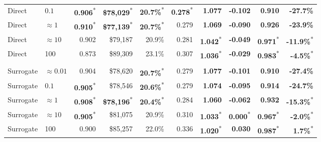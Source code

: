 \documentclass[10pt]{article}
\theoremstyle{definition}
\newcommand{\1}{\mathbf{1}}
\newcommand{\latesttext}[1]{\textcolor{latestPurple}{#1}}
\begin{document}
{\begin{table}[!htbp]
{\begin{tabular}{llrrrrrrrr}
Direct & \latesttext{$0.1$} & \textbf{0.906}\textsuperscript{*} & \textbf{\$78,029}\textsuperscript{*} & \latesttext{\textbf{20.7\%}\textsuperscript{*}} & \latesttext{\textbf{0.278}\textsuperscript{*}} & \textbf{1.077} & \textbf{-0.102} & \textbf{0.910} & \textbf{-27.7\%} \\
Direct & \latesttext{$\approx1$} & \textbf{0.910}\textsuperscript{*} & \textbf{\$77,139}\textsuperscript{*} & \latesttext{\textbf{20.7\%}\textsuperscript{*}} & \latesttext{0.279} & \textbf{1.069} & \textbf{-0.090} & \textbf{0.926} & \textbf{-23.9\%} \\
Direct & \latesttext{$\approx10$} & 0.902 & \$79,187 & \latesttext{20.9\%} & \latesttext{0.281} & \textbf{1.042}\textsuperscript{*} & \textbf{-0.049} & \textbf{0.971}\textsuperscript{*} & \textbf{-11.9\%}\textsuperscript{*} \\
Direct & 100 & 0.873 & \$89,309 & \latesttext{23.1\%} & \latesttext{0.307} & \textbf{1.036}\textsuperscript{*} & \textbf{-0.029} & \textbf{0.983}\textsuperscript{*} & \textbf{-4.5\%}\textsuperscript{*} \\
\addlinespace[3pt]
\multicolumn{10}{l}{\textbf{Surrogate penalty}} \\
\cmidrule(lr){1-10}
\latesttext{Surrogate} & \latesttext{$\approx0.01$} & \latesttext{0.904} & \latesttext{\$78,620} & \latesttext{\textbf{20.7\%}\textsuperscript{*}} & \latesttext{0.279} & \latesttext{\textbf{1.077}} & \latesttext{\textbf{-0.101}} & \latesttext{\textbf{0.910}} & \latesttext{\textbf{-27.4\%}} \\
Surrogate & \latesttext{$0.1$} & \textbf{0.905}\textsuperscript{*} & \$78,546 & \latesttext{\textbf{20.6\%}\textsuperscript{*}} & \latesttext{0.279} & \textbf{1.074} & \textbf{-0.095} & \textbf{0.914} & \textbf{-24.7\%} \\
Surrogate & \latesttext{$\approx1$} & \textbf{0.908}\textsuperscript{*} & \textbf{\$78,196}\textsuperscript{*} & \latesttext{\textbf{20.4\%}\textsuperscript{*}} & \latesttext{0.284} & \textbf{1.060} & \textbf{-0.062} & \textbf{0.932} & \textbf{-15.3\%}\textsuperscript{*} \\
Surrogate & \latesttext{$\approx10$} & \textbf{0.905}\textsuperscript{*} & \$81,075 & \latesttext{20.9\%} & \latesttext{0.310} & \textbf{1.033}\textsuperscript{*} & \textbf{0.000}\textsuperscript{*} & \textbf{0.967}\textsuperscript{*} & \textbf{-2.0\%}\textsuperscript{*} \\
Surrogate & 100 & 0.900 & \$85,257 & \latesttext{22.0\%} & \latesttext{0.336} & \textbf{1.020}\textsuperscript{*} & \textbf{0.030} & \textbf{0.987}\textsuperscript{*} & \textbf{1.7\%}\textsuperscript{*} \\

\end{tabular}}
\end{table}}
\end{document}
